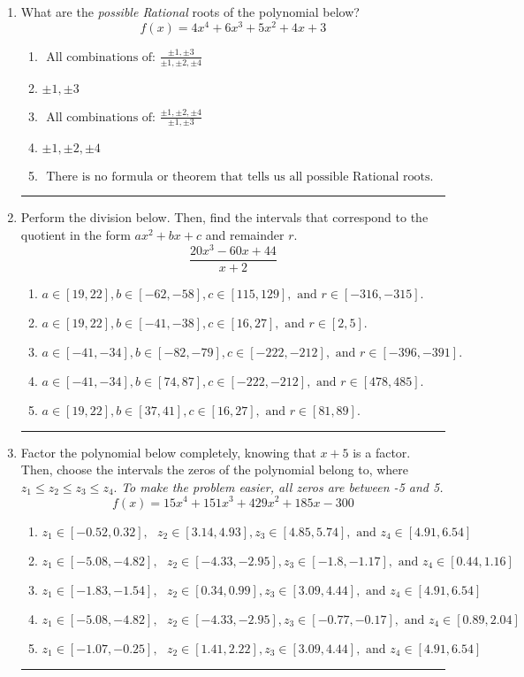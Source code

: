 \documentclass[14pt]{extbook}
\newcommand{\litem}[1]{\item#1\hspace*{-1cm}\rule{\textwidth}{0.4pt}}
\begin{document}
\begin{enumerate}
{\begin{enumerate}[label=\Alph*.]
\end{enumerate} }
\litem{
What are the \textit{possible Rational} roots of the polynomial below?\[ f(x) = 4x^{4} +6 x^{3} +5 x^{2} +4 x + 3 \]\begin{enumerate}[label=\Alph*.]
\item \( \text{ All combinations of: }\frac{\pm 1,\pm 3}{\pm 1,\pm 2,\pm 4} \)
\item \( \pm 1,\pm 3 \)
\item \( \text{ All combinations of: }\frac{\pm 1,\pm 2,\pm 4}{\pm 1,\pm 3} \)
\item \( \pm 1,\pm 2,\pm 4 \)
\item \( \text{ There is no formula or theorem that tells us all possible Rational roots.} \)

\end{enumerate} }
\litem{
Perform the division below. Then, find the intervals that correspond to the quotient in the form $ax^2+bx+c$ and remainder $r$.\[ \frac{20x^{3} -60 x + 44}{x + 2} \]\begin{enumerate}[label=\Alph*.]
\item \( a \in [19, 22], b \in [-62, -58], c \in [115, 129], \text{ and } r \in [-316, -315]. \)
\item \( a \in [19, 22], b \in [-41, -38], c \in [16, 27], \text{ and } r \in [2, 5]. \)
\item \( a \in [-41, -34], b \in [-82, -79], c \in [-222, -212], \text{ and } r \in [-396, -391]. \)
\item \( a \in [-41, -34], b \in [74, 87], c \in [-222, -212], \text{ and } r \in [478, 485]. \)
\item \( a \in [19, 22], b \in [37, 41], c \in [16, 27], \text{ and } r \in [81, 89]. \)

\end{enumerate} }
\litem{
Factor the polynomial below completely, knowing that $x + 5$ is a factor. Then, choose the intervals the zeros of the polynomial belong to, where $z_1 \leq z_2 \leq z_3 \leq z_4$. \textit{To make the problem easier, all zeros are between -5 and 5.}\[ f(x) = 15x^{4} +151 x^{3} +429 x^{2} +185 x -300 \]\begin{enumerate}[label=\Alph*.]
\item \( z_1 \in [-0.52, 0.32], \text{   }  z_2 \in [3.14, 4.93], z_3 \in [4.85, 5.74], \text{   and   } z_4 \in [4.91, 6.54] \)
\item \( z_1 \in [-5.08, -4.82], \text{   }  z_2 \in [-4.33, -2.95], z_3 \in [-1.8, -1.17], \text{   and   } z_4 \in [0.44, 1.16] \)
\item \( z_1 \in [-1.83, -1.54], \text{   }  z_2 \in [0.34, 0.99], z_3 \in [3.09, 4.44], \text{   and   } z_4 \in [4.91, 6.54] \)
\item \( z_1 \in [-5.08, -4.82], \text{   }  z_2 \in [-4.33, -2.95], z_3 \in [-0.77, -0.17], \text{   and   } z_4 \in [0.89, 2.04] \)
\item \( z_1 \in [-1.07, -0.25], \text{   }  z_2 \in [1.41, 2.22], z_3 \in [3.09, 4.44], \text{   and   } z_4 \in [4.91, 6.54] \)


\end{enumerate}}
\end{enumerate}
\end{document}
